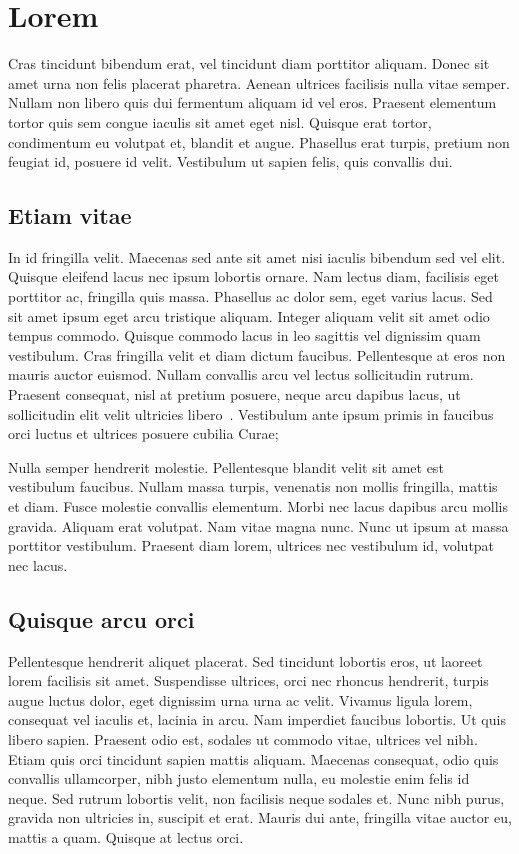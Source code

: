 \chapter{Lorem}
\label{section:lorem}

Cras tincidunt bibendum erat, vel tincidunt diam porttitor aliquam. Donec sit amet urna non felis placerat pharetra. Aenean ultrices facilisis nulla vitae semper. Nullam non libero quis dui fermentum aliquam id vel eros. Praesent elementum tortor quis sem congue iaculis sit amet eget nisl. Quisque erat tortor, condimentum eu volutpat et, blandit et augue. Phasellus erat turpis, pretium non feugiat id, posuere id velit. Vestibulum ut sapien felis, quis convallis dui.

\section{Etiam vitae}
\label{section:lorem:etiam}

In id fringilla velit. Maecenas sed ante sit amet nisi iaculis bibendum sed vel elit. Quisque eleifend lacus nec ipsum lobortis ornare. Nam lectus diam, facilisis eget porttitor ac, fringilla quis massa. Phasellus ac dolor sem, eget varius lacus. Sed sit amet ipsum eget arcu tristique aliquam. Integer aliquam velit sit amet odio tempus commodo. Quisque commodo lacus in leo sagittis vel dignissim quam vestibulum. Cras fringilla velit et diam dictum faucibus. Pellentesque at eros non mauris auctor euismod. Nullam convallis arcu vel lectus sollicitudin rutrum. Praesent consequat, nisl at pretium posuere, neque arcu dapibus lacus, ut sollicitudin elit velit ultricies libero~\cite{Author:06}. Vestibulum ante ipsum primis in faucibus orci luctus et ultrices posuere cubilia Curae;

Nulla semper hendrerit molestie. Pellentesque blandit velit sit amet est vestibulum faucibus. Nullam massa turpis, venenatis non mollis fringilla, mattis et diam. Fusce molestie convallis elementum. Morbi nec lacus dapibus arcu mollis gravida. Aliquam erat volutpat. Nam vitae magna nunc. Nunc ut ipsum at massa porttitor vestibulum. Praesent diam lorem, ultrices nec vestibulum id, volutpat nec lacus.

\section{Quisque arcu orci}
\label{section:lorem:quisque}

Pellentesque hendrerit aliquet placerat. Sed tincidunt lobortis eros, ut laoreet lorem facilisis sit amet. Suspendisse ultrices, orci nec rhoncus hendrerit, turpis augue luctus dolor, eget dignissim urna urna ac velit. Vivamus ligula lorem, consequat vel iaculis et, lacinia in arcu. Nam imperdiet faucibus lobortis. Ut quis libero sapien. Praesent odio est, sodales ut commodo vitae, ultrices vel nibh. Etiam quis orci tincidunt sapien mattis aliquam. Maecenas consequat, odio quis convallis ullamcorper, nibh justo elementum nulla, eu molestie enim felis id neque. Sed rutrum lobortis velit, non facilisis neque sodales et. Nunc nibh purus, gravida non ultricies in, suscipit et erat. Mauris dui ante, fringilla vitae auctor eu, mattis a quam. Quisque at lectus orci.

